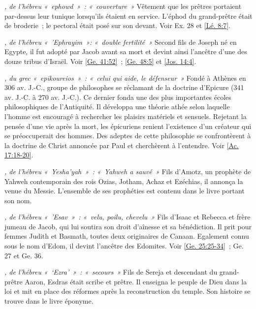 \begin{multicols}{2}
\textit{, de l'hébreu «~ephowd~»~: «~couverture~»}\newline
Vêtement que les prêtres portaient par-dessus leur tunique lorsqu'ils étaient en service. L'éphod du grand-prêtre était de broderie~; le pectoral était posé sur son devant. Voir Ex. 28 et \vref{Lé. 8:7}.

\textit{, de l'hébreu «~'Ephrayim~»: «~double fertilité~»}\newline
Second fils de Joseph né en Egypte, il fut adopté par Jacob avant sa mort et devint ainsi l'ancêtre d'une des douze tribus d'Israël. Voir \vref{Ge. 41:52}~; \vref{Ge. 48:5} et \vref{Jos. 14:4}.

\textit{, du grec «~epikoureios~»~: «~celui qui aide, le défenseur~»}\newline
Fondé à Athènes en 306 av. J.-C., groupe de philosophes se réclamant de la doctrine d'Epicure (341 av. J.-C. à 270 av. J.-C.). Ce dernier fonda une des plus importantes écoles philosophiques de l'Antiquité. Il développa une théorie athée selon laquelle l'homme est encouragé à rechercher les plaisirs matériels et sensuels. Rejetant la pensée d'une vie après la mort, les épicuriens renient l'existence d'un créateur qui se préoccuperait des hommes. Des adeptes de cette philosophie se confrontèrent à la doctrine de Christ annoncée par Paul et cherchèrent à l'entendre. Voir \vref{Ac. 17:18-20}.

\textit{, de l'hébreu «~Yesha'yah~»~: «~Yahweh a sauvé~»}\newline
Fils d'Amotz, un prophète de Yahweh contemporain des rois Ozias, Jotham, Achaz et Ezéchias, il annonça la venue du Messie. L'ensemble de ses prophéties est contenu dans le livre portant son nom.

\textit{, de l'hébreu «~'Esav~»~: «~velu, poilu, chevelu~»}\newline
Fils d'Isaac et Rebecca et frère jumeau de Jacob, qui lui soutira son droit d'aînesse et sa bénédiction. Il prit pour femmes Judith et Basmath, toutes deux originaires de Canaan. Egalement connu sous le nom d'Edom, il devint l'ancêtre des Edomites. Voir \vref{Ge. 25:25-34}~; Ge. 27 et Ge. 36.

\textit{, de l'hébreu «~`Ezra'~»~: «~secours~»}\newline
Fils de Sereja et descendant du grand-prêtre Aaron, Esdras était scribe et prêtre. Il enseigna le peuple de Dieu dans la loi et mit en place des réformes après la reconstruction du temple. Son histoire se trouve dans le livre éponyme.


\end{multicols}
